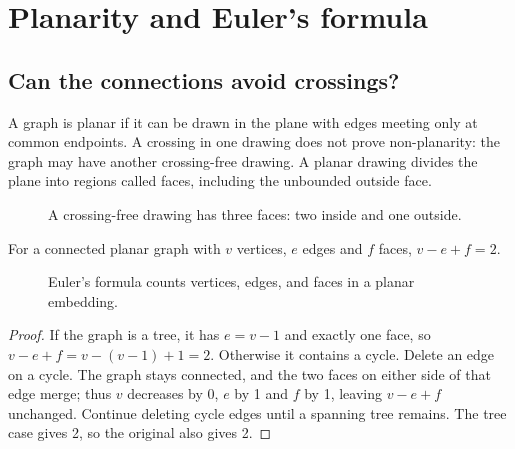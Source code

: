 \chapter{Planarity and Euler's formula}
\section*{Can the connections avoid crossings?}
A graph is planar if it can be drawn in the plane with edges meeting only at common endpoints. A crossing in one drawing does not prove non-planarity: the graph may have another crossing-free drawing. A planar drawing divides the plane into regions called faces, including the unbounded outside face.

\begin{figure}[htbp]
\centering
{}
\caption{A crossing-free drawing has three faces: two inside and one outside.}
\end{figure}

\begin{theorem}
For a connected planar graph with $v$ vertices, $e$ edges and $f$ faces, $v-e+f=2$.
\end{theorem}
\begin{figure}[htbp]
\centering
{}
\caption{Euler's formula counts vertices, edges, and faces in a planar embedding.}
\end{figure}
\begin{proof}
If the graph is a tree, it has $e=v-1$ and exactly one face, so $v-e+f=v-(v-1)+1=2$. Otherwise it contains a cycle. Delete an edge on a cycle. The graph stays connected, and the two faces on either side of that edge merge; thus $v$ decreases by 0, $e$ by 1 and $f$ by 1, leaving $v-e+f$ unchanged. Continue deleting cycle edges until a spanning tree remains. The tree case gives 2, so the original also gives 2.
\end{proof}

